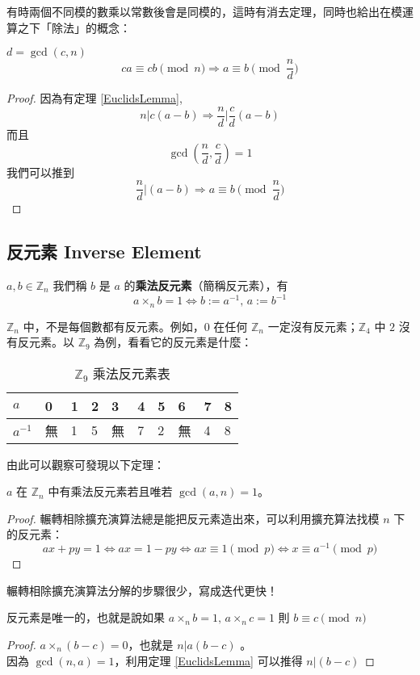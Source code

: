 有時兩個不同模的數乘以常數後會是同模的，這時有消去定理，同時也給出在模運算之下「除法」的概念：
\begin{theorem}[消去定理]
\label{modcancelationLaw}
$d=\gcd(c,n)$
$$ca\equiv cb \pmod n\Rightarrow a\equiv b \pmod{\frac n d}$$
\end{theorem}
\begin{proof}
因為有定理 \ref{EuclidsLemma},
$$n|c(a-b) \Rightarrow\frac n d\bigg\vert\frac c d (a-b)$$
而且 $$\gcd\left(\frac n d,\frac c d\right)=1$$
我們可以推到$$\frac n d\bigg\vert (a-b)\Rightarrow a\equiv b\pmod{\frac n d}$$
\end{proof}


\subsection{反元素 Inverse Element}
\label{sec:mod:inv}

\begin{definition}
$a,b\in\mathbb Z_n$ 我們稱 $b$ 是 $a$ 的\textbf{乘法反元素}（簡稱反元素），有 $$a\times_n b=1 \Leftrightarrow b:=a^{-1},\,a:=b^{-1}$$
\end{definition}

$\mathbb Z_n$ 中，不是每個數都有反元素。例如，$0$ 在任何 $\mathbb Z_n$ 一定沒有反元素；$\mathbb Z_4$ 中 $2$ 沒有反元素。以 $\mathbb Z_9$ 為例，看看它的反元素是什麼：

\begin{table}[h]
    \begin{tabularx}{\textwidth}{X | X | X | X | X | X | X | X | X | X}
        $a$      & 0 & 1 & 2 & 3 & 4 & 5 & 6 & 7 & 8 \\ \hline
        $a^{-1}$ & 無 & 1 & 5 & 無 & 7 & 2 & 無 & 4 & 8
    \end{tabularx}
    \label{tab:mod:inv:table}
    \caption{$\mathbb Z_9$ 乘法反元素表}
\end{table}

由此可以觀察可發現以下定理：
\begin{theorem}
$a$ 在 $\mathbb Z_n$ 中有乘法反元素若且唯若 $\gcd(a,n)=1$。
\end{theorem}
\begin{proof}
輾轉相除擴充演算法總是能把反元素造出來，可以利用擴充算法找模 $n$ 下的反元素：$$ax+py=1\Leftrightarrow ax=1-py\Leftrightarrow ax \equiv 1 \pmod p\Leftrightarrow x\equiv a^{-1}\pmod p$$
\end{proof}
輾轉相除擴充演算法分解的步驟很少，寫成迭代更快！

\begin{theorem}
\label{UniqueInverse}
反元素是唯一的，也就是說如果 $a\times_n b=1,\,a\times_n c=1$ 則 $b\equiv c\pmod n$
\end{theorem}
\begin{proof}
$a\times_n (b-c)=0$，也就是 $n|a(b-c)$ 。\\
因為 $\gcd(n,a)=1$，利用定理 \ref{EuclidsLemma} 可以推得 $n|(b-c)$
\end{proof}


